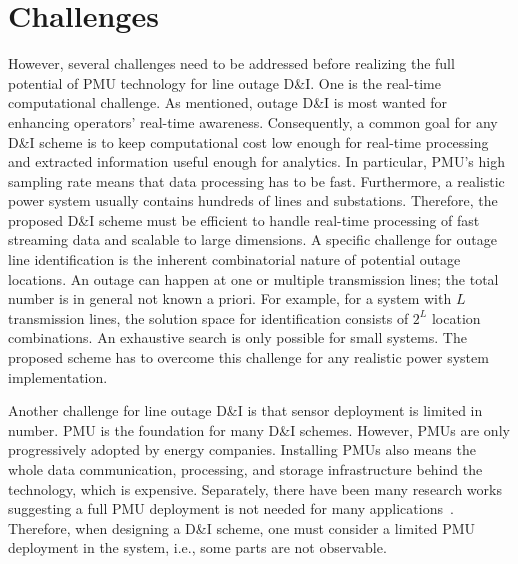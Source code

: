 \section{Challenges}
However, several challenges need to be addressed before realizing the full potential of PMU technology for line outage D\&I. 
One is the real-time computational challenge. As mentioned, outage D\&I is most wanted for enhancing operators’ real-time awareness. Consequently, a common goal for any D\&I scheme is to keep computational cost low enough for real-time processing and extracted information useful enough for analytics.
In particular, PMU’s high sampling rate means that data processing has to be fast. Furthermore, a realistic power system usually contains hundreds of lines and substations. Therefore, the proposed D\&I scheme must be efficient to handle real-time processing of fast streaming data and scalable to large dimensions.
A specific challenge for outage line identification is the inherent combinatorial nature of potential outage locations. An outage can happen at one or multiple transmission lines; the total number is in general not known a priori. For example, for a system with $L$ transmission lines, the solution space for identification consists of $2^L$ location combinations. An exhaustive search is only possible for small systems. The proposed scheme has to overcome this challenge for any realistic power system implementation.


Another challenge for line outage D\&I is that sensor deployment is limited in number. 
PMU is the foundation for many D\&I schemes. However, PMUs are only progressively adopted by energy companies. Installing PMUs also means the whole data communication, processing, and storage infrastructure behind the technology, which is expensive. Separately, there have been many research works suggesting a full PMU deployment is not needed for many applications~\cite{aminifar2014synchrophasor}. Therefore, when designing a D\&I scheme, one must consider a limited PMU deployment in the system, i.e., some parts are not observable.

